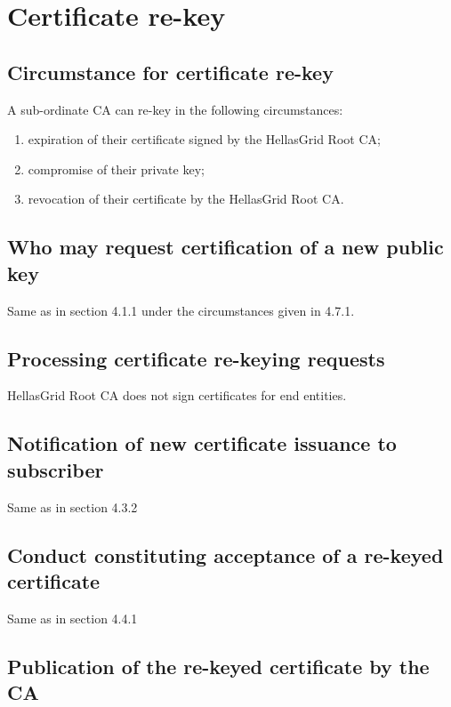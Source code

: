 \documentclass[11pt,a4paper,titlepage]{book}
\begin{document}
\section{Certificate re-key}
\subsection{Circumstance for certificate re-key}

A sub-ordinate CA can re-key in the following circumstances:

\begin{enumerate}
\item{expiration of their certificate signed by the HellasGrid Root CA;}
\item{compromise of their private key;}
\item{revocation of their certificate by the HellasGrid Root CA.}
\end{enumerate}

\subsection{Who may request certification of a new public key}

Same as in section 4.1.1 under the circumstances given in 4.7.1.

\subsection{Processing certificate re-keying requests}



HellasGrid Root CA does not sign certificates for end entities.


\subsection{Notification of new certificate issuance to subscriber}


Same as in section 4.3.2

\subsection{Conduct constituting acceptance of a re-keyed certificate}

Same as in section 4.4.1

\subsection{Publication of the re-keyed certificate by the CA}
\end{document}
